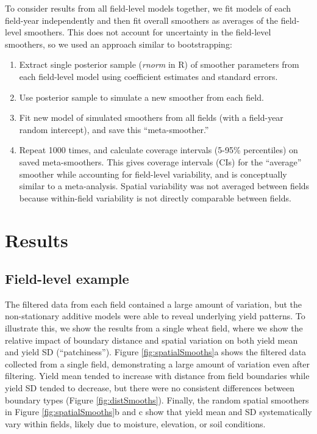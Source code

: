 \documentclass[]{elsarticle} %
\providecommand{\tightlist}{%
  \setlength{\itemsep}{0pt}\setlength{\parskip}{0pt}}
\begin{document}
To consider results from all field-level models together, we fit models of each field-year independently and then fit overall smoothers as averages of the field-level smoothers.
This does not account for uncertainty in the field-level smoothers, so we used an approach similar to bootstrapping:

\begin{enumerate}
\def\labelenumi{\arabic{enumi}.}
\tightlist
\item
  Extract single posterior sample (\emph{rnorm} in R) of smoother parameters from each field-level model using coefficient estimates and standard errors.
\item
  Use posterior sample to simulate a new smoother from each field.
\item
  Fit new model of simulated smoothers from all fields (with a field-year random intercept), and save this ``meta-smoother.''
\item
  Repeat 1000 times, and calculate coverage intervals (5-95\% percentiles) on saved meta-smoothers.
  This gives coverage intervals (CIs) for the ``average'' smoother while accounting for field-level variability, and is conceptually similar to a meta-analysis.
  Spatial variability was not averaged between fields because within-field variability is not directly comparable between fields.
\end{enumerate}

\hypertarget{results}{%
\section{Results}\label{results}}

\hypertarget{field-level-example}{%
\subsection{Field-level example}\label{field-level-example}}

The filtered data from each field contained a large amount of variation, but the non-stationary additive models were able to reveal underlying yield patterns.
To illustrate this, we show the results from a single wheat field, where we show the relative impact of boundary distance and spatial variation on both yield mean and yield SD (``patchiness'').
Figure \ref{fig:spatialSmooths}a shows the filtered data collected from a single field, demonstrating a large amount of variation even after filtering.
Yield mean tended to increase with distance from field boundaries while yield SD tended to decrease, but there were no consistent differences between boundary types (Figure \ref{fig:distSmooths}).
Finally, the random spatial smoothers in Figure \ref{fig:spatialSmooths}b and c show that yield mean and SD systematically vary within fields, likely due to moisture, elevation, or soil conditions.
\end{document}
